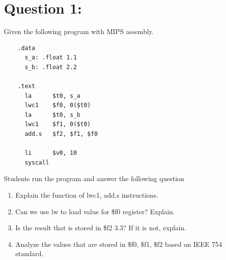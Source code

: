 \documentclass[12pt,a4paper]{article}
\begin{document}
\begin{titlepage}
\begin{center}
\begin{minipage}{0.4\textwidth}
\begin{flushright}
      \end{flushright}
    \end{minipage}

    \vfill

    \vspace{2cm}
    {\large} %
  \end{center}
\end{titlepage}


\section*{Question 1:}
Given the following program with MIPS assembly.
\begin{mdframed}[hidealllines=true,backgroundcolor=magenta!10]
  \begin{lstlisting}
    .data
      s_a: .float 1.1
      s_b: .float 2.2

    .text
      la      $t0, s_a
      lwc1    $f0, 0($t0)
      la      $t0, s_b
      lwc1    $f1, 0($t0)
      add.s   $f2, $f1, $f0

      li      $v0, 10
      syscall
  \end{lstlisting}
\end{mdframed}
Students run the program and answer the following question
\begin{enumerate}
  \item Explain the function of lwc1, add.s instructions.
  \item Can we use lw to load value for \$f0 register? Explain.
  \item Is the result that is stored in \$f2 3.3? If it is not, explain.
  \item Analyze the values that are stored in \$f0, \$f1, \$f2 based on IEEE 754 standard.
\end{enumerate}

\end{document}

